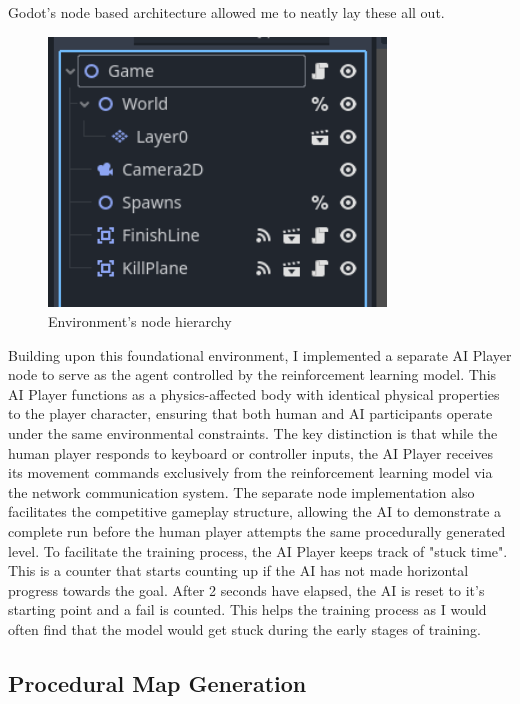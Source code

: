 Godot's node based architecture allowed me to neatly lay these all out.

\begin{figure}[H]
    \centering
    \includegraphics[width=0.8\textwidth]{figures/godot_nodes_basic.png}
    \caption{Environment's node hierarchy}
    \label{fig:godot_nodes_basic}
\end{figure}

Building upon this foundational environment, I implemented a separate AI Player node to serve as the agent controlled by the reinforcement learning model. 
This AI Player functions as a physics-affected body with identical physical properties to the player character, ensuring that both human and AI participants operate under the same environmental constraints. 
The key distinction is that while the human player responds to keyboard or controller inputs, the AI Player receives its movement commands exclusively from the reinforcement learning model via the network communication system. 
The separate node implementation also facilitates the competitive gameplay structure, allowing the AI to demonstrate a complete run before the human player attempts the same procedurally generated level.
To facilitate the training process, the AI Player keeps track of "stuck time". This is a counter that starts counting up if the AI has not made horizontal progress towards the goal. 
After 2 seconds have elapsed, the AI is reset to it's starting point and a fail is counted. This helps the training process as I would often find that the model would get stuck during the early stages of training.

\subsection{Procedural Map Generation}

